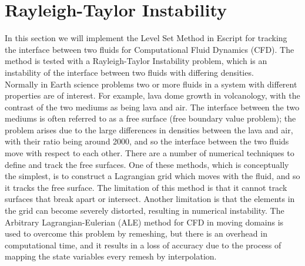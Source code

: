 
%
%
%

\section{Rayleigh-Taylor Instability}
\label{LEVELSET CHAP}

In this section we will implement the Level Set Method in Escript for tracking the interface between two fluids for Computational Fluid Dynamics (CFD). The method is tested with a Rayleigh-Taylor Instability problem, which is an instability of the interface between two fluids with differing densities. \\ 
Normally in Earth science problems two or more fluids in a system with different properties are of interest. For example, lava dome growth in volcanology, with the contrast of the two mediums as being lava and air. The interface between the two mediums is often referred to as a free surface (free boundary value problem); the problem arises due to the large differences in densities between the lava and air, with their ratio being around 2000, and so the interface between the two fluids move with respect to each other.  
There are a number of numerical techniques to define and track the free surfaces. One of these methods, which is conceptually the simplest, is to construct a Lagrangian grid which moves with the fluid, and so it tracks the free surface. The limitation of this method is that it cannot track surfaces that break apart or intersect. Another limitation is that the elements in the grid can become severely distorted, resulting in numerical instability. The Arbitrary Lagrangian-Eulerian (ALE) method for CFD in moving domains is used to overcome this problem by remeshing, but there is an overhead in computational time, and it results in a loss of accuracy due to the process of mapping the state variables every remesh by interpolation.

